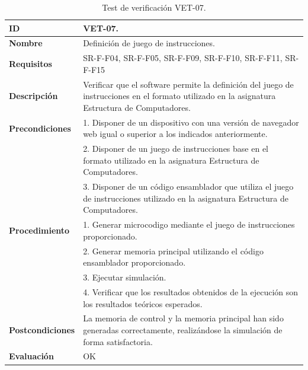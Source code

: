 \begin{center}
\begin{table}[htbp]
\centering
\caption{Test de verificación VET-07.}
\begin{tabular}{@{}p{2.5cm} p{13cm}@{}} 
\toprule
\textbf{ID} 					& VET-07. \\
\midrule
\textbf{Nombre} 				& Definición de juego de instrucciones. \\
\midrule
\textbf{Requisitos} 		& SR-F-F04, SR-F-F05, SR-F-F09, SR-F-F10, SR-F-F11, SR-F-F15\\
\midrule
\textbf{Descripción} 		& Verificar que el \gls{software} permite la definición del juego de instrucciones en el formato utilizado en la asignatura Estructura de Computadores. \\
\midrule
\textbf{Precondiciones}		& 1. Disponer de un dispositivo con una versión de navegador web igual o superior a los indicados anteriormente. \\
											& 2. Disponer de un juego de instrucciones base en el formato utilizado en la asignatura Estructura de Computadores. \\
											& 3. Disponer de un código \gls{ensamblador} que utiliza el juego de instrucciones utilizado en la asignatura Estructura de Computadores. \\
\midrule
\textbf{Procedimiento}		& 1. Generar \gls{microcodigo} mediante el juego de instrucciones proporcionado.\\
											& 2. Generar memoria principal utilizando el código \gls{ensamblador} proporcionado.\\
											& 3. Ejecutar simulación.\\
											& 4. Verificar que los resultados obtenidos de la ejecución son los resultados teóricos esperados.\\
\midrule
\textbf{Postcondiciones} 		&  La memoria de control y la memoria principal han sido generadas correctamente, realizándose la simulación de forma satisfactoria.\\
\midrule
\textbf{Evaluación} 			& OK \\
\bottomrule
\end{tabular}
\label{tab:vet07}
\end{table}
\end{center}

